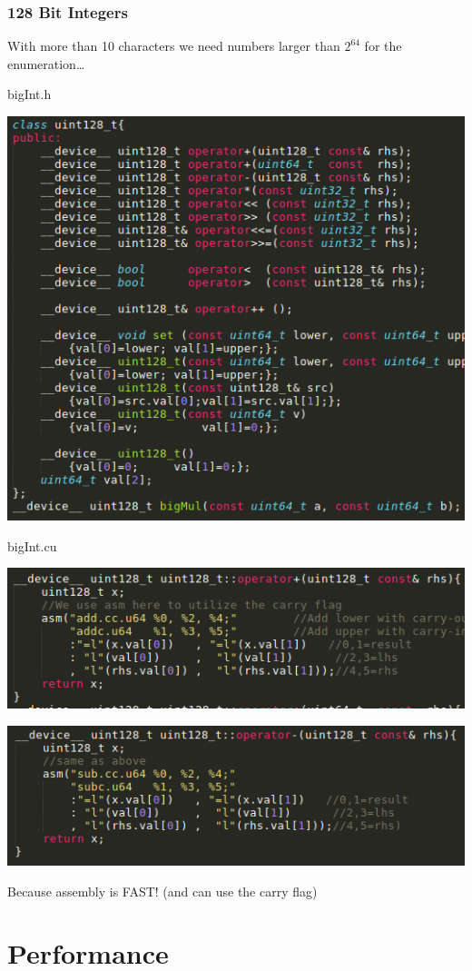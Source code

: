 \documentclass{beamer}
\begin{document}
\begin{frame}
	\frametitle{128 Bit Integers}
	With more than 10 characters we need numbers larger than $2^{64}$ for the enumeration\dots
	\vspace{-1em}
	\begin{multicols}{2}[]
	\begin{center}
		bigInt.h

		\includegraphics[width=.5\textwidth]{bigInt_1.png}

		bigInt.cu

		\includegraphics[width=.5\textwidth]{bigInt_2.png}

		\includegraphics[width=.5\textwidth]{bigInt_3.png}

		Because assembly is FAST\@! (and can use the carry flag)
	\end{center}
	\end{multicols}
\end{frame}

\section{Performance}
\end{document}
